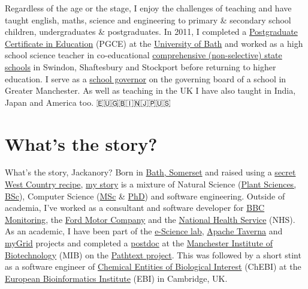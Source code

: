 \documentclass[
  12pt,
]{book}
\begin{document}
Regardless of the age or the stage, I enjoy the challenges of teaching and have taught english, maths, science and engineering to primary \& secondary school children, undergraduates \& postgraduates. In 2011, I completed a \href{https://en.wikipedia.org/wiki/Postgraduate_Certificate_in_Education}{Postgraduate Certificate in Education} (PGCE) at the \href{https://www.bath.ac.uk/}{University of Bath} and worked as a high school science teacher in co-educational \href{https://www.gov.uk/types-of-school}{comprehensive (non-selective) state schools} in Swindon, Shaftesbury and Stockport before returning to higher education. I serve as a \href{https://www.manchester.ac.uk/connect/teachers/school-governors/}{school governor} on the governing board of a school in Greater Manchester. As well as teaching in the UK I have also taught in India, Japan and America too. 🇪🇺🇬🇧🇮🇳🇯🇵🇺🇸

\hypertarget{whats-the-story}{%
\section*{What's the story?}\label{whats-the-story}}

What's the story, Jackanory? Born in \href{https://en.wikipedia.org/wiki/Bath,_Somerset}{Bath, Somerset} and raised using a \href{https://en.wikipedia.org/wiki/West_Country}{secret West Country recipe}, \href{https://uk.linkedin.com/in/duncanhull}{my story} is a mixture of Natural Science (\href{https://speakerdeck.com/dullhunk/why-study-plants}{Plant Sciences, BSc}), Computer Science (\href{mastersofscience.html}{MSc} \& \href{https://www.librarysearch.manchester.ac.uk/permalink/44MAN_INST/1r887gn/alma992976677936301631}{PhD}) and software engineering. Outside of academia, I've worked as a consultant and software developer for \href{https://en.wikipedia.org/wiki/BBC_Monitoring}{BBC Monitoring}, the \href{https://en.wikipedia.org/wiki/Ford_Motor_Company}{Ford Motor Company} and the \href{https://en.wikipedia.org/wiki/National_Health_Service}{National Health Service} (NHS). As an academic, I have been part of the \href{https://esciencelab.org.uk/}{e-Science lab}, \href{https://en.wikipedia.org/wiki/Apache_Taverna}{Apache Taverna} and \href{https://en.wikipedia.org/wiki/MyGrid}{myGrid} projects and completed a \href{https://en.wikipedia.org/wiki/Postdoctoral_researcher}{postdoc} at the \href{https://www.mib.manchester.ac.uk/}{Manchester Institute of Biotechnology} (MIB) on the \href{https://pubmed.ncbi.nlm.nih.gov/20529930/}{Pathtext project}. This was followed by a short stint as a software engineer of \href{https://en.wikipedia.org/wiki/ChEBI}{Chemical Entities of Biological Interest} (ChEBI) at the \href{https://en.wikipedia.org/wiki/European_Bioinformatics_Institute}{European Bioinformatics Institute} (EBI) in Cambridge, UK. 🧬👨‍🔬
\end{document}
